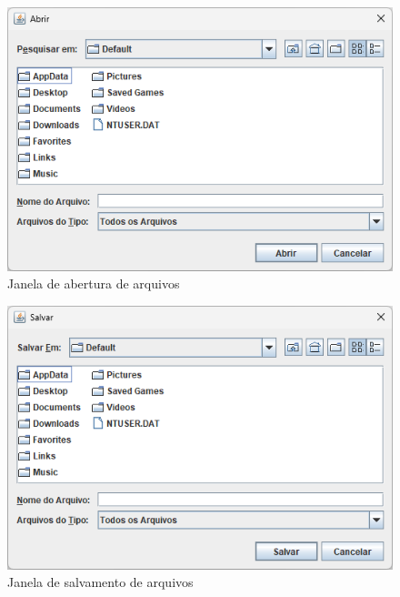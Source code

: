 \documentclass[12pt]{article}
\begin{document}
\begin{figure}[H]
    \centering
    \includegraphics[width=\textwidth]{Captura de tela 2024-06-01 111051}
    \caption{Janela de abertura de arquivos}
    \label{fig:fig-6}
\end{figure}

\begin{figure}[H]
    \centering
    \includegraphics[width=\textwidth]{Captura de tela 2024-06-01 111107}
    \caption{Janela de salvamento de arquivos}
    \label{fig:fig-7}
\end{figure}
\end{document}
